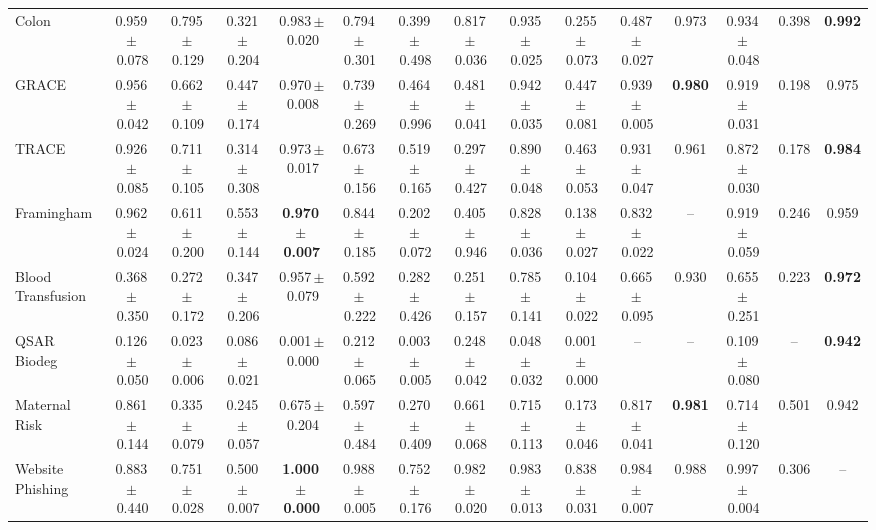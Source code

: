 \documentclass[8pt]{extarticle}
\begin{document}
\begin{longtable}{l*{14}{c}}
Colon & 0.959\,$\pm$\,0.078 & 0.795\,$\pm$\,0.129 & 0.321\,$\pm$\,0.204 & 0.983\,$\pm$\,0.020 & 0.794\,$\pm$\,0.301 & 0.399\,$\pm$\,0.498 & 0.817\,$\pm$\,0.036 & 0.935\,$\pm$\,0.025 & 0.255\,$\pm$\,0.073 & 0.487\,$\pm$\,0.027 & 0.973 & 0.934\,$\pm$\,0.048 & 0.398 & \textbf{0.992} \\
GRACE & 0.956\,$\pm$\,0.042 & 0.662\,$\pm$\,0.109 & 0.447\,$\pm$\,0.174 & 0.970\,$\pm$\,0.008 & 0.739\,$\pm$\,0.269 & 0.464\,$\pm$\,0.996 & 0.481\,$\pm$\,0.041 & 0.942\,$\pm$\,0.035 & 0.447\,$\pm$\,0.081 & 0.939\,$\pm$\,0.005 & \textbf{0.980} & 0.919\,$\pm$\,0.031 & 0.198 & 0.975 \\
TRACE & 0.926\,$\pm$\,0.085 & 0.711\,$\pm$\,0.105 & 0.314\,$\pm$\,0.308 & 0.973\,$\pm$\,0.017 & 0.673\,$\pm$\,0.156 & 0.519\,$\pm$\,0.165 & 0.297\,$\pm$\,0.427 & 0.890\,$\pm$\,0.048 & 0.463\,$\pm$\,0.053 & 0.931\,$\pm$\,0.047 & 0.961 & 0.872\,$\pm$\,0.030 & 0.178 & \textbf{0.984} \\
Framingham & 0.962\,$\pm$\,0.024 & 0.611\,$\pm$\,0.200 & 0.553\,$\pm$\,0.144 & \textbf{0.970\,$\pm$\,0.007} & 0.844\,$\pm$\,0.185 & 0.202\,$\pm$\,0.072 & 0.405\,$\pm$\,0.946 & 0.828\,$\pm$\,0.036 & 0.138\,$\pm$\,0.027 & 0.832\,$\pm$\,0.022 & -- & 0.919\,$\pm$\,0.059 & 0.246 & 0.959 \\
Blood Transfusion & 0.368\,$\pm$\,0.350 & 0.272\,$\pm$\,0.172 & 0.347\,$\pm$\,0.206 & 0.957\,$\pm$\,0.079 & 0.592\,$\pm$\,0.222 & 0.282\,$\pm$\,0.426 & 0.251\,$\pm$\,0.157 & 0.785\,$\pm$\,0.141 & 0.104\,$\pm$\,0.022 & 0.665\,$\pm$\,0.095 & 0.930 & 0.655\,$\pm$\,0.251 & 0.223 & \textbf{0.972} \\
QSAR Biodeg & 0.126\,$\pm$\,0.050 & 0.023\,$\pm$\,0.006 & 0.086\,$\pm$\,0.021 & 0.001\,$\pm$\,0.000 & 0.212\,$\pm$\,0.065 & 0.003\,$\pm$\,0.005 & 0.248\,$\pm$\,0.042 & 0.048\,$\pm$\,0.032 & 0.001\,$\pm$\,0.000 & -- & -- & 0.109\,$\pm$\,0.080 & -- & \textbf{0.942} \\
Maternal Risk & 0.861\,$\pm$\,0.144 & 0.335\,$\pm$\,0.079 & 0.245\,$\pm$\,0.057 & 0.675\,$\pm$\,0.204 & 0.597\,$\pm$\,0.484 & 0.270\,$\pm$\,0.409 & 0.661\,$\pm$\,0.068 & 0.715\,$\pm$\,0.113 & 0.173\,$\pm$\,0.046 & 0.817\,$\pm$\,0.041 & \textbf{0.981} & 0.714\,$\pm$\,0.120 & 0.501 & 0.942 \\
Website Phishing & 0.883\,$\pm$\,0.440 & 0.751\,$\pm$\,0.028 & 0.500\,$\pm$\,0.007 & \textbf{1.000\,$\pm$\,0.000} & 0.988\,$\pm$\,0.005 & 0.752\,$\pm$\,0.176 & 0.982\,$\pm$\,0.020 & 0.983\,$\pm$\,0.013 & 0.838\,$\pm$\,0.031 & 0.984\,$\pm$\,0.007 & 0.988 & 0.997\,$\pm$\,0.004 & 0.306 & -- \\
\end{longtable}
\end{document}
